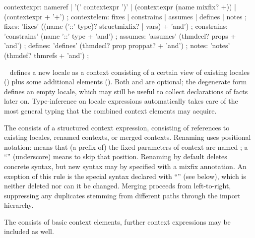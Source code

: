 \begin{isabellebody}
\begin{isamarkuptext}
\begin{rail}
    contextexpr: nameref | '(' contextexpr ')' |
    (contextexpr (name mixfix? +)) | (contextexpr + '+')
    ;
    contextelem: fixes | constrains | assumes | defines | notes
    ;
    fixes: 'fixes' ((name ('::' type)? structmixfix? | vars) + 'and')
    ;
    constrains: 'constrains' (name '::' type + 'and')
    ;
    assumes: 'assumes' (thmdecl? props + 'and')
    ;
    defines: 'defines' (thmdecl? prop proppat? + 'and')
    ;
    notes: 'notes' (thmdef? thmrefs + 'and')
    ;
  \end{rail}

  \begin{description}
  
  \item \hyperlink{command.locale}{\mbox{}}~ defines a
  new locale  as a context consisting of a certain view of
  existing locales () plus some additional elements
  ().  Both  and  are optional;
  the degenerate form \hyperlink{command.locale}{\mbox{}}~ defines an empty
  locale, which may still be useful to collect declarations of facts
  later on.  Type-inference on locale expressions automatically takes
  care of the most general typing that the combined context elements
  may acquire.

  The  consists of a structured context expression,
  consisting of references to existing locales, renamed contexts, or
  merged contexts.  Renaming uses positional notation:  means that (a prefix of) the fixed
  parameters of context  are named ; a ``\isa{{\isacharunderscore}}'' (underscore) means to skip that
  position.  Renaming by default deletes concrete syntax, but new
  syntax may by specified with a mixfix annotation.  An exeption of
  this rule is the special syntax declared with ``\isa{{\isachardoublequote}{\isacharparenleft}{\isasymSTRUCTURE}{\isacharparenright}{\isachardoublequote}}'' (see below), which is neither deleted nor can it
  be changed.  Merging proceeds from left-to-right, suppressing any
  duplicates stemming from different paths through the import
  hierarchy.

  The  consists of basic context elements, further context
  expressions may be included as well.


\end{description}
\end{isamarkuptext}
\end{isabellebody}
